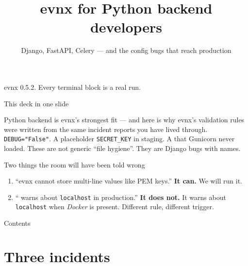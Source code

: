 \documentclass[aspectratio=169,10pt]{beamer}
\title{evnx for Python backend developers}
\subtitle{Django, FastAPI, Celery --- and the config bugs that reach production}
\date{}
\begin{document}
\begin{frame}[plain]
  \titlepage
  \begin{center}\footnotesize
  \textcolor{evnxMuted}{evnx 0.5.2. Every terminal block is a real run.}
  \end{center}
\end{frame}

\begin{frame}{This deck in one slide}
  \begin{block}{Python backend is evnx's strongest fit --- and here is why}
    evnx's validation rules were written from the same incident reports you
    have lived through. \texttt{DEBUG="False"}. A placeholder
    \texttt{SECRET\_KEY} in staging. A  that Gunicorn never loaded.
    These are not generic ``file hygiene''. They are Django bugs with names.
  \end{block}

  \vspace{0.6em}
  \begin{block}{Two things the room will have been told wrong}
    \begin{enumerate}
      \item ``evnx cannot store multi-line values like PEM keys.''
            \textbf{It can.} We will run it.
      \item `` warns about \texttt{localhost} in production.''
            \textbf{It does not.} It warns about \texttt{localhost} when
            \emph{Docker} is present. Different rule, different trigger.
    \end{enumerate}
  \end{block}
\end{frame}

\begin{frame}{Contents}\tableofcontents[hideallsubsections]\end{frame}

\section{Three incidents}
\end{document}
